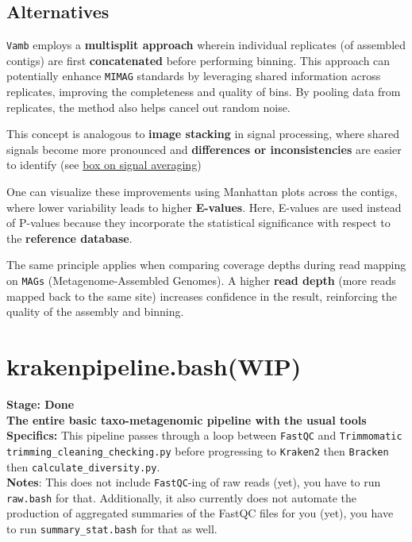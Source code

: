 \documentclass[11pt]{report}
\begin{document}
{\subsection{Alternatives}
\begin{tcolorbox}
	\texttt{Vamb} employs a \textbf{multisplit approach} wherein individual replicates (of assembled contigs) are first \textbf{concatenated} before performing binning. This approach can potentially enhance \texttt{MIMAG} standards by leveraging shared information across replicates, improving the completeness and quality of bins. By pooling data from replicates, the method also helps cancel out random noise.
	
	This concept is analogous to \textbf{image stacking} in signal processing, where shared signals become more pronounced and \textbf{differences or inconsistencies} are easier to identify (see \hyperref[box:signal_averaging]{box on signal averaging})
	
	One can visualize these improvements using Manhattan plots across the contigs, where lower variability leads to higher\textbf{ E-values}. Here, E-values are used instead of P-values because they incorporate the statistical significance with respect to the \textbf{reference database}.
	
	The same principle applies when comparing coverage depths during read mapping on \texttt{MAGs} (Metagenome-Assembled Genomes). A higher \textbf{read depth} (more reads mapped back to the same site) increases confidence in the result, reinforcing the quality of the assembly and binning.
		
\end{tcolorbox}

\linenumbers*
\section{krakenpipeline.bash(WIP)}
\textbf{Stage: Done} \\   
\textbf{The entire basic taxo-metagenomic pipeline with the usual tools} \\
\textbf{Specifics:} This pipeline passes through a loop between \texttt{FastQC} and \texttt{Trimmomatic} \texttt{trimming\_cleaning\_checking.py} before progressing to \texttt{Kraken2} then \texttt{Bracken} then \texttt{calculate\_diversity.py}. \\
\textbf{Notes}: This does not include \texttt{FastQC}-ing of raw reads (yet), you have to run \texttt{raw.bash} for that. Additionally, it also currently does not automate the production of aggregated summaries of the FastQC files for you (yet), you have to run \texttt{summary\_stat.bash} for that as well. 

}
\end{document}

